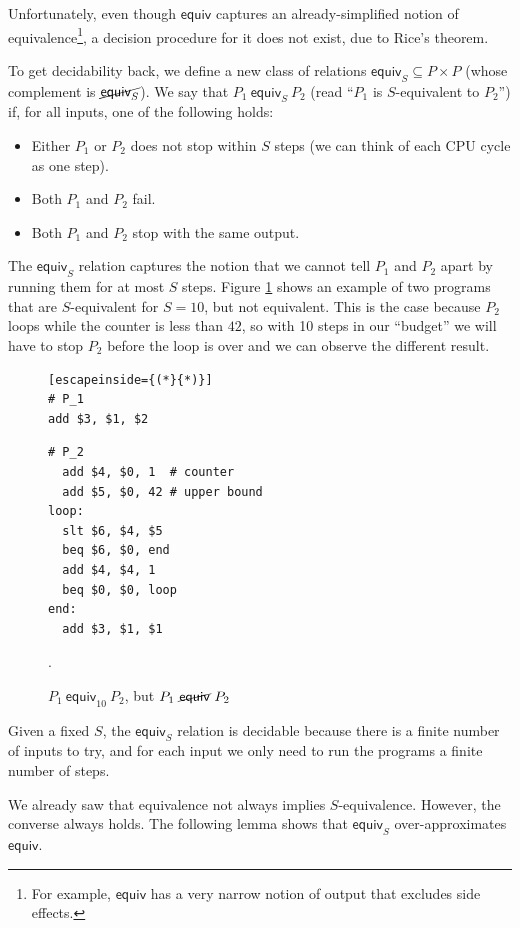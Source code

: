 \documentclass{llncs}
\newcommand{\erel}{\textsf{equiv}}
\newcommand{\merel}[1]{\textsf{equiv}_{#1}}
\newcommand{\pmequiv}[3]{#1 \ \merel{#3} \ #2}
\newcommand{\pnequiv}[2]{#1 \ \cancel{\erel} \ #2}
\begin{document}
Unfortunately, even though $\erel$ captures an already-simplified notion of equivalence\footnote{For example, $\erel$ has a very narrow notion of output that excludes side effects.}, a decision procedure for it does not exist, due to Rice's theorem.

To get decidability back, we define a new class of relations $\merel{S} \subseteq P \times P$ (whose complement is $\cancel{\merel{S}}$). We say that $\pmequiv{P_1}{P_2}{S}$ (read ``$P_1$ is $S$-equivalent to $P_2$'') if, for all inputs, one of the following holds:
\begin{itemize}
\item Either $P_1$ or $P_2$ does not stop within $S$ steps (we can think of each CPU cycle as one step).
\item Both $P_1$ and $P_2$ fail.
\item Both $P_1$ and $P_2$ stop with the same output. 
\end{itemize}

The $\merel{S}$ relation captures the notion that we cannot tell $P_1$ and $P_2$ apart by running them for at most $S$ steps. Figure \ref{sequiv} shows an example of two programs that are $S$-equivalent for $S=10$, but not equivalent. This is the case because $P_2$ loops while the counter is less than $42$, so with 10 steps in our ``budget'' we will have to stop $P_2$ before the loop is over and we can observe the different result.

\begin{figure}
\begin{multicols}{2}
\begin{lstlisting}[escapeinside={(*}{*)}]
# P_1
add $3, $1, $2
\end{lstlisting}
\vfill\null
\columnbreak
\begin{lstlisting}
# P_2
  add $4, $0, 1  # counter
  add $5, $0, 42 # upper bound
loop:
  slt $6, $4, $5 
  beq $6, $0, end
  add $4, $4, 1
  beq $0, $0, loop
end:
  add $3, $1, $1  
\end{lstlisting}
\end{multicols}
\caption{$\pmequiv{P_1}{P_2}{10}$, but $\pnequiv{P_1}{P_2}$}.
\label{sequiv}
\end{figure}

Given a fixed $S$, the $\merel{S}$ relation is decidable because there is a finite number of inputs to try, and for each input we only need to run the programs a finite number of steps.

We already saw that equivalence not always implies $S$-equivalence. However, the converse always holds. The following lemma shows that $\merel{S}$ over-approximates $\erel$.
\end{document}
